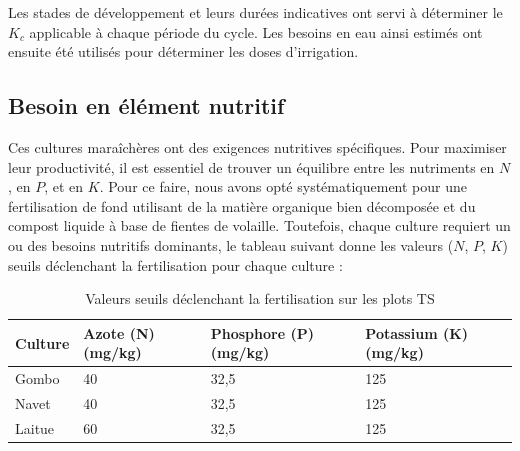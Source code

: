 Les stades de développement et leurs durées indicatives ont servi à déterminer le $K_c$ applicable à chaque période du cycle. 
Les besoins en eau ainsi estimés ont ensuite été utilisés pour déterminer les doses d’irrigation.

\subsection{Besoin en élément nutritif}
Ces cultures maraîchères ont des exigences nutritives spécifiques. Pour maximiser leur productivité, il est essentiel de trouver un équilibre entre les nutriments en $N$, en $P$, et en $K$. 
Pour ce faire, nous avons opté systématiquement pour une fertilisation de fond utilisant de la matière organique bien décomposée et du compost liquide à base de fientes de volaille. Toutefois, chaque culture requiert un ou des besoins nutritifs dominants, le tableau suivant donne les valeurs ($N$, $P$, $K$) seuils déclenchant la fertilisation pour chaque culture :

\begin{table}[H]
    \centering
    \caption{Valeurs seuils déclenchant la fertilisation sur les plots TS}
    \label{tab:seuils_fertilisation_ts}
    \begin{tabular}{|p{3cm}|p{3.4cm}|p{3.8cm}|p{3.8cm}|}
        \hline
        \textbf{Culture} & \textbf{Azote (N) (mg/kg)} & \textbf{Phosphore (P) (mg/kg)} & \textbf{Potassium (K) (mg/kg)} \\
        \hline
        Gombo & 40 & 32,5 & 125 \\
        \hline
        Navet & 40 & 32,5 & 125 \\
        \hline
        Laitue & 60 & 32,5 & 125 \\
        \hline
    \end{tabular}
\end{table}
